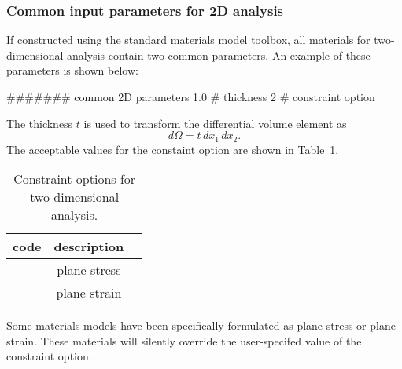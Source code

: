 \subsubsection{Common input parameters for 2D analysis}
\label{sect.material.2D.common}
If constructed using the standard \tahoe materials model toolbox, all 
materials for two-dimensional analysis contain two common parameters.
An example of these parameters is shown below:
\begin{inputfile}
####### common 2D parameters
1.0   # thickness
2     # constraint option
\end{inputfile}
The thickness $t$ is used to transform the differential volume element
as
\begin{equation}
	d\Omega = t\,dx_{1}\,dx_{2}.
\end{equation}
The acceptable values for the constaint option are shown in 
Table~\ref{tab.2Dconstraint}.
\begin{table}[h]
\caption{\label{tab.2Dconstraint} Constraint options for 
two-dimensional analysis.}
\begin{center}
\begin{tabular}[c]{|l|c|c|}
\hline
 \parbox[b]{0.75in}{\centering \textbf{code}}
&\parbox[b]{2.0in}{\raggedright \textbf{description}}\\
\hline
\parbox[b]{0.75in}{} & 
\parbox[b]{2.0in}{\raggedright plane stress}\\
\hline
\parbox[b]{0.75in}{}  & 
\parbox[b]{2.0in}{\raggedright plane strain}\\
\hline
\end{tabular}
\end{center}
\end{table}
Some materials models have been specifically formulated as plane 
stress or plane strain. These materials will silently 
override the user-specifed value of the constraint option.

